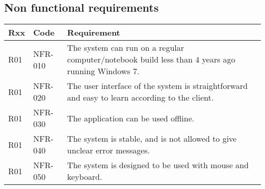 \subsection{Non functional requirements}
\begin{tabularx}{\textwidth}{|p{0.5cm}p{2cm}X|}\hline
	Rxx & Code & Requirement \\\hline
	R01 & NFR-010 & The system can run on a regular computer/notebook build less than 4 years ago running Windows 7.\\\hline
	R01 & NFR-020 & The user interface of the system is straightforward and easy to learn according to the client.\\\hline
	R01 & NFR-030 & The application can be used offline.\\\hline
	R01 & NFR-040 & The system is stable, and is not allowed to give unclear error messages.\\\hline
	R01 & NFR-050 & The system is designed to be used with mouse and keyboard.\\\hline
\end{tabularx}

